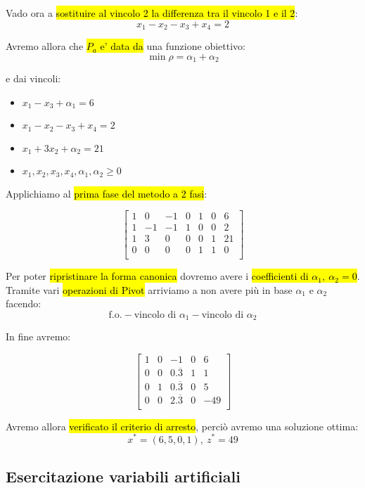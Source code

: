 Vado ora a \hl{sostituire al vincolo 2 la differenza tra il vincolo 1 e il 2}:
$$x_1 - x_2 - x_3 + x_4 = 2$$

Avremo allora che \hl{$P_a$ e' data da} una funzione obiettivo:
$$\min \rho = \alpha_1 + \alpha_2$$

e dai vincoli:

\begin{itemize}
	\item $x_1 - x_3 + \alpha_1 = 6$
	\item $x_1 - x_2 -x_3 + x_4 = 2$
	\item $x_1 + 3x_2 + \alpha_2 = 21$
	\item $x_1, x_2, x_3, x_4, \alpha_1, \alpha_2 \geq 0$
\end{itemize}

Applichiamo al \hl{prima fase del metodo a 2 fasi}:


$$
\left[ {\begin{array}{ccccccc}
	1 & 0 & -1 & 0 & 1 & 0 & 6\\
	1 & -1 & -1 & 1 & 0 & 0 & 2\\
	1 & 3 & 0 & 0 & 0 & 1 & 21\\
	0 & 0 & 0 & 0 & 1 & 1 & 0\\
\end{array} } \right]
$$

Per poter \hl{ripristinare la forma canonica} dovremo avere i \hl{coefficienti di $\alpha_1,\ \alpha_2 = 0$}. Tramite vari \hl{operazioni di Pivot} arriviamo a non avere più in base $\alpha_1$ e $\alpha_2$ facendo:
$$\text{f.o.} - \text{vincolo di }\alpha_1 - \text{vincolo di }\alpha_2$$

In fine avremo:


$$
\left[ {\begin{array}{ccccc}
	1 & 0 & -1 & 0 & 6\\
	0 & 0 & 0.\overline{3} & 1 & 1\\
	0 & 1 & 0.\overline{3} & 0 & 5\\
	0 & 0 & 2.\overline{3} & 0 & -49\\
\end{array} } \right]
$$

Avremo allora \hl{verificato il criterio di arresto}, perciò avremo una soluzione ottima:
$$x^* = (6, 5, 0, 1),\ z^* = 49$$


\subsection{Esercitazione variabili artificiali}

